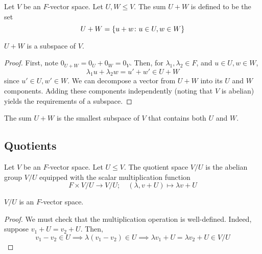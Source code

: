 \begin{definition}
	Let \( V \) be an \( F \)-vector space.
	Let \( U, W \leq V \).
	The sum \( U + W \) is defined to be the set
	\[
		U + W = \qty{ u + w \colon u \in U, w \in W }
	\]
\end{definition}
\begin{proposition}
	\( U + W \) is a subspace of \( V \).
\end{proposition}
\begin{proof}
	First, note \( 0_{U+W} = 0_U + 0_W = 0_V \).
	Then, for \( \lambda_1, \lambda_2 \in F \), and \( u \in U, w \in W \),
	\[
		\lambda_1 u + \lambda_2 w = u' + w' \in U + W
	\]
	since \( u' \in U, w' \in W \).
	We can decompose a vector from \( U + W \) into its \( U \) and \( W \) components.
	Adding these components independently (noting that \( V \) is abelian) yields the requirements of a subspace.
\end{proof}
\begin{proposition}
	The sum \( U + W \) is the smallest subspace of \( V \) that contains both \( U \) and \( W \).
\end{proposition}

\subsection{Quotients}
\begin{definition}
	Let \( V \) be an \( F \)-vector space.
	Let \( U \leq V \).
	The quotient space \( V / U \) is the abelian group \( V / U \) equipped with the scalar multiplication function
	\[
		F \times V / U \to V / U;\quad (\lambda, v + U) \mapsto \lambda v + U
	\]
\end{definition}
\begin{proposition}
	\( V / U \) is an \( F \)-vector space.
\end{proposition}
\begin{proof}
	We must check that the multiplication operation is well-defined.
	Indeed, suppose \( v_1 + U = v_2 + U \).
	Then,
	\[
		v_1 - v_2 \in U \implies \lambda (v_1 - v_2) \in U \implies \lambda v_1 + U = \lambda v_2 + U \in V / U
	\]
\end{proof}

